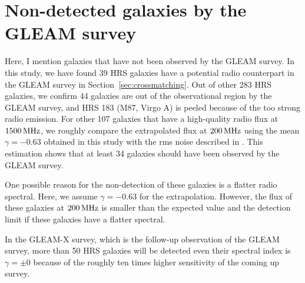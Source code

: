 \section{Non-detected galaxies by the GLEAM survey}\label{sec:nondetectedgalaxiesbythegleamsurvey}

Here, I mention galaxies that have not been observed by the GLEAM survey.
In this study, we have found 39 HRS galaxies have a potential radio counterpart in the GLEAM survey in Section~\ref{sec:crossmatching}.
Out of other 283 HRS galaxies, we confirm 44 galaxies are out of the observational region by the GLEAM survey, and HRS 183 (M87, Virgo A) is peeled because of the too strong radio emission.
For other 107 galaxies that have a high-quality radio flux at $1500\,\mathrm{MHz}$, we roughly compare the extrapolated flux at $200\,\mathrm{MHz}$ using the mean $\gamma = -0.63$ obtained in this study with the rms noise described in \citet{Hurley-Walker2017a}.
This estimation shows that at least 34 galaxies should have been observed by the GLEAM survey.

One possible reason for the non-detection of these galaxies is a flatter radio spectral.
Here, we assume $\gamma = -0.63$ for the extrapolation.
However, the flux of these galaxies at $200\,\mathrm{MHz}$ is smaller than the expected value and the detection limit if these galaxies have a flatter spectral.

In the GLEAM-X survey, which is the follow-up observation of the GLEAM survey, more than 50 HRS galaxies will be detected even their spectral index is $\gamma = \pm 0$ because of the roughly ten times higher sensitivity of the coming up survey.



%
%
